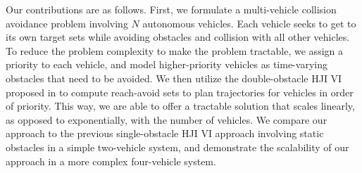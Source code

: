 Our contributions are as follows. First, we formulate a multi-vehicle collision avoidance problem involving $N$ autonomous vehicles. Each vehicle seeks to get to its own target sets while avoiding obstacles and collision with all other vehicles. To reduce the problem complexity to make the problem tractable, we assign a priority to each vehicle, and model higher-priority vehicles as time-varying obstacles that need to be avoided. We then utilize the double-obstacle HJI VI proposed in \cite{fisac15} to compute reach-avoid sets to plan trajectories for vehicles in order of priority. This way, we are able to offer a tractable solution that scales linearly, as opposed to exponentially, with the number of vehicles. We compare our approach to the previous single-obstacle HJI VI approach involving static obstacles \cite{mitchell05, bokanowski10, mitchell-thesis} in a simple two-vehicle system, and demonstrate the scalability of our approach in a more complex four-vehicle system.